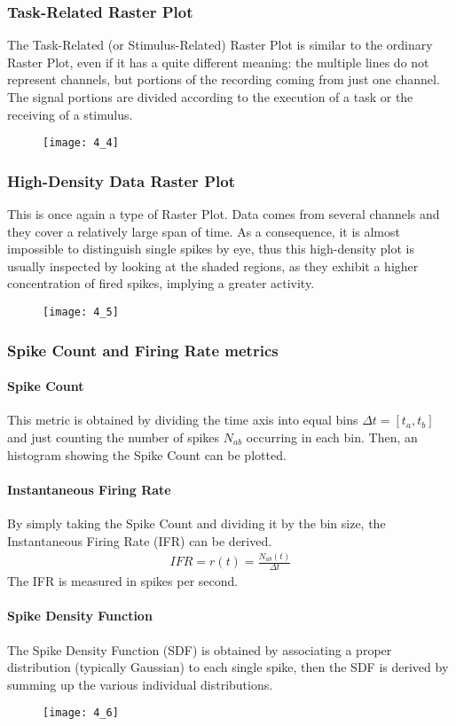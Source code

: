 \subsubsection{Task-Related Raster Plot}
The Task-Related (or Stimulus-Related) Raster Plot is similar to the ordinary Raster Plot, even if it
has a quite different meaning: the multiple lines do not represent channels, but portions of the
recording coming from just one channel. The signal portions are divided according to the execution of
a task or the receiving of a stimulus.
\begin{figure}[H]
    \texttt{[image: 4\_4]}
    \centering
\end{figure}
\subsubsection{High-Density Data Raster Plot}
This is once again a type of Raster Plot. Data comes from several channels and they cover a relatively
large span of time. As a consequence, it is almost impossible to distinguish single spikes by eye,
thus this high-density plot is usually inspected by looking at the shaded regions, as they exhibit a
higher concentration of fired spikes, implying a greater activity.
\begin{figure}[H]
    \texttt{[image: 4\_5]}
    \centering
\end{figure}
\subsubsection{Spike Count and Firing Rate metrics}
\paragraph{Spike Count}
This metric is obtained by dividing the time axis into equal bins \(\Delta{t}=[t_a,t_b]\) and just
counting the number of spikes \(N_{ab}\) occurring in each bin.
Then, an histogram showing the Spike Count can be plotted.
\paragraph{Instantaneous Firing Rate}
By simply taking the Spike Count and dividing it by the bin size, the Instantaneous Firing Rate (IFR)
can be derived.
\begin{align*}
    IFR=r(t)=\frac{N_{ab}(t)}{\Delta{t}}
\end{align*}
The IFR is measured in spikes per second.
\paragraph{Spike Density Function}
The Spike Density Function (SDF) is obtained by associating a proper distribution (typically Gaussian)
to each single spike, then the SDF is derived by summing up the various individual distributions.
\begin{figure}[H]
    \texttt{[image: 4\_6]}
    \centering
\end{figure}
